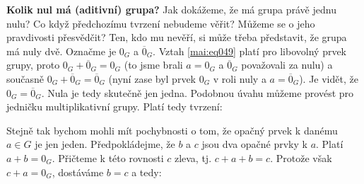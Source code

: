 \wikitextrule
\begin{example}\label{mai:exam046}
  \textbf{Kolik nul má (aditivní) grupa?}\newline\small
  Jak dokážeme, že má grupa právě jednu nulu? Co když předchozímu tvrzení nebudeme věřit? Můžeme se 
  o jeho pravdivosti přesvědčit? Ten, kdo mu nevěří, si může třeba představit, že grupa má nuly 
  dvě. Označme je \(0_G\) a \(\overline{0}_G\). Vztah \ref{mai:eq049} platí pro libovolný prvek 
  grupy, proto \(0_G + \overline{0}_G = 0_G\) (to jsme brali \(a = 0_G\) a \(\overline{0}_G\) 
  považovali za nulu) a současně \(0_G + \overline{0}_G = \overline{0}_G\) (nyní zase byl prvek 
  \(0_G\) v roli nuly a \(a = \overline{0}_G\)). Je vidět, že \(0_G = \overline{0}_G\). Nula je 
  tedy skutečně jen jedna. Podobnou úvahu můžeme provést pro jedničku multiplikativní grupy. Platí 
  tedy tvrzení:
  
  \noindent

  
  Stejně tak bychom mohli mít pochybnosti o tom, že opačný prvek k danému \(a\in G\) je jen jeden. 
  Předpokládejme, že \(b\) a \(c\) jsou dva opačné prvky k \(a\). Platí \(a + b = 0_G\). Přičteme k 
  této rovnosti \(c\) zleva, tj. \(c + a + b = c\). Protože však \(c + a = 0_G\), dostáváme \(b=c\) 
  a tedy:
 
  \noindent
  \normalsize
\end{example}